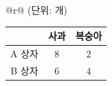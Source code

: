\begin{tabular}{@{}r@{}}
{\footnotesize (단위: 개)}\\[1pt]
\begin{tabular}{|c|c|c|}
\hline
 & 사과 & 복숭아 \\
\hline
A 상자 & $8$ & $2$ \\
\hline
B 상자 & $6$ & $4$ \\
\hline
\end{tabular}
\end{tabular}
